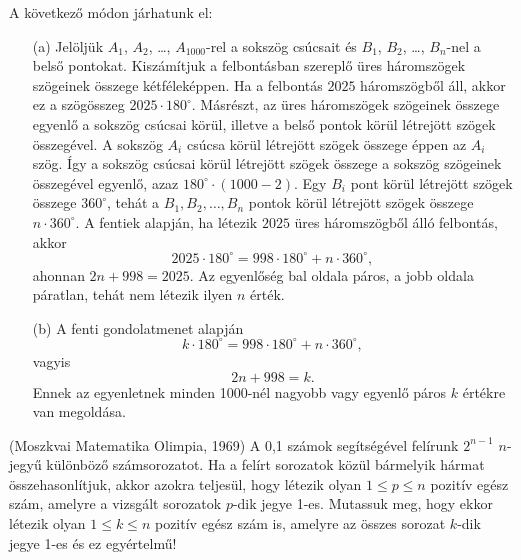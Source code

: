 \begin{solution}
	A következő módon járhatunk el:
	\begin{itemize}
		\item[(a)] Jelöljük $A_{1}$, $A_{2}$, \ldots , $A_{1000}$-rel a sokszög csúcsait
		és $B_{1}$, $B_{2}$, \ldots , $B_{n}$-nel a belső pontokat. Kiszámítjuk
		a felbontásban szereplő üres háromszögek szögeinek összege kétféleképpen.
		Ha a felbontás $2025$ háromszögből áll, akkor ez a szögösszeg $2025\cdot180^{\circ}$.
		Másrészt, az üres háromszögek szögeinek összege egyenlő a sokszög
		csúcsai körül, illetve a belső pontok körül létrejött szögek összegével.
		A sokszög $A_{i}$ csúcsa körül létrejött szögek összege éppen az
		$A_{i}$ szög. Így a sokszög csúcsai körül létrejött szögek összege
		a sokszög szögeinek összegével egyenlő, azaz $180^{\circ}\cdot(1000-2)$.
		Egy $B_{i}$ pont körül létrejött szögek összege $360^{\circ}$, tehát
		a $B_{1},B_{2},\ldots,B_{n}$ pontok körül létrejött szögek összege
		$n\cdot360^{\circ}$. A fentiek alapján, ha létezik $2025$ üres háromszögből
		álló felbontás, akkor 
		\[
		2025\cdot180^{\circ}=998\cdot180^{\circ}+n\cdot360^{\circ},
		\]
		ahonnan $2n+998=2025$. Az egyenlőség bal oldala páros, a jobb oldala
		páratlan, tehát nem létezik ilyen $n$ érték. 
		\item[(b)] A fenti gondolatmenet alapján 
		\[
		k\cdot180^{\circ}=998\cdot180^{\circ}+n\cdot360^{\circ},
		\]
		vagyis 
		\[
		2n+998=k.
		\]
		Ennek az egyenletnek minden 1000-nél nagyobb vagy egyenlő páros $k$
		értékre van megoldása. 
	\end{itemize}
\end{solution}
\begin{extraproblem}
	(Moszkvai Matematika Olimpia, 1969) A 0,1 számok segítségével felírunk
	$2^{n-1}$ $n$-jegyű különböző számsorozatot. Ha a felírt sorozatok
	közül bármelyik hármat összehasonlítjuk, akkor azokra teljesül, hogy
	létezik olyan $1\leq p\leq n$ pozitív egész szám, amelyre a vizsgált
	sorozatok $p$-dik jegye 1-es. Mutassuk meg, hogy ekkor létezik olyan
	$1\leq k\leq n$ pozitív egész szám is, amelyre az összes sorozat
	$k$-dik jegye 1-es és ez egyértelmű! 
\end{extraproblem}
